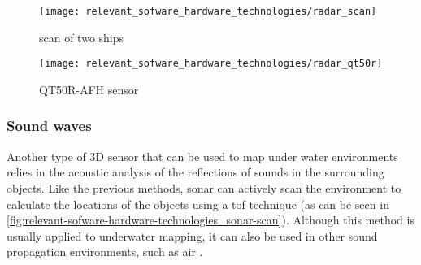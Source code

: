 \begin{savenotes}
\begin{figure}[H]
	\centering
	\begin{minipage}[h]{.47\textwidth}
		\centering
		\texttt{[image: relevant\_sofware\_hardware\_technologies/radar\_scan]}
		\caption[ scan of two ships]{ scan of two ships\protect\footnotemark}
		\label{fig:relevant-sofware-hardware-technologies_radar-scan}
	\end{minipage}\hfill
	\begin{minipage}[h]{.47\textwidth}
		\centering
		\texttt{[image: relevant\_sofware\_hardware\_technologies/radar\_qt50r]}
		\caption[QT50R-AFH  sensor]{QT50R-AFH  sensor\protect\footnotemark}
		\label{fig:relevant-sofware-hardware-technologies_radar-qt50r}
	\end{minipage}
\end{figure}
\end{savenotes}



\subsubsection{Sound waves}

Another type of 3D sensor that can be used to map under water environments relies in the acoustic analysis of the reflections of sounds in the surrounding objects. Like the previous methods, \gls{sonar} can actively scan the environment to calculate the locations of the objects using a \gls{tof} technique (as can be seen in \cref{fig:relevant-sofware-hardware-technologies_sonar-scan}). Although this method is usually applied to underwater mapping, it can also be used in other sound propagation environments, such as air \cite{Guarato2013}.

